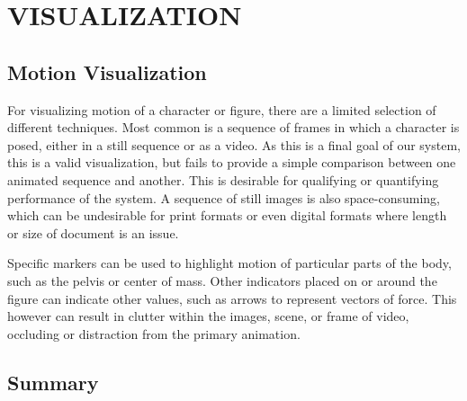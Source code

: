 
 
\chapter{VISUALIZATION}
\label{chapter:visualization}


\section{Motion Visualization}
\label{section:motion_vis}
For visualizing motion of a character or figure, there are a limited selection of different techniques.  Most common is a sequence of frames in which a character is posed, either in a still sequence or as a video.  As this is a final goal of our system, this is a valid visualization, but fails to provide a simple comparison between one animated sequence and another.  This is desirable for qualifying or quantifying performance of the system.  A sequence of still images is also space-consuming, which can be undesirable for print formats or even digital formats where length or size of document is an issue.

Specific markers can be used to highlight motion of particular parts of the body, such as the pelvis or center of mass.  Other indicators placed on or around the figure can indicate other values, such as arrows to represent vectors of force.  This however can result in clutter within the images, scene, or frame of video, occluding or distraction from the primary animation.

\section{Summary}
\label{section:vis_summary}
